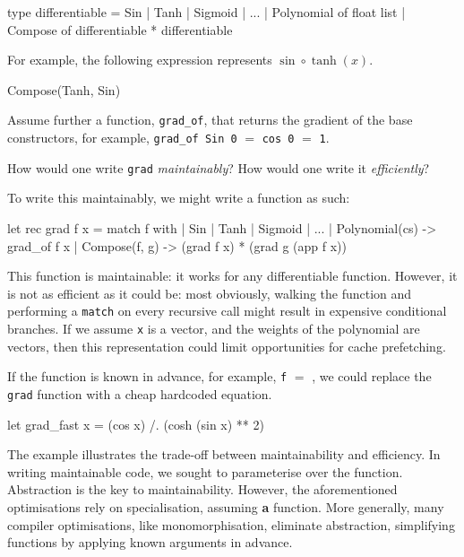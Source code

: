 \begin{ocaml}
type differentiable = Sin | Tanh | Sigmoid | ...
                    | Polynomial of float list
                    | Compose of differentiable * differentiable
\end{ocaml}
For example, the following expression represents $\sin\circ \tanh(x)$. 

\begin{ocaml}
Compose(Tanh, Sin)
\end{ocaml}

Assume further a function, \texttt{grad_of}, that returns the gradient of the base constructors, for example, \texttt{grad_of Sin 0} $=$ \texttt{cos 0} $=$ \texttt{1}.

How would one write \texttt{grad} \textit{maintainably}? How would one write it \textit{efficiently}?  

To write this maintainably, we might write a function as such: 

\begin{ocaml}
let rec grad f x = 
  match f with
  | Sin
  | Tanh
  | Sigmoid
  | ...
  | Polynomial(cs) -> grad_of f x 
  | Compose(f, g) -> (grad f x) * (grad g (app f x))

\end{ocaml}

This function is maintainable: it works for {any} differentiable function. However, it is not as efficient as it could be: most obviously, walking the function and performing a \texttt{match} on every recursive call might result in expensive conditional branches. If we assume \texttt{x} is a vector, and the weights of the polynomial are vectors, then this representation could limit opportunities for cache prefetching.

If  the function is known in advance, for example, \texttt{f} $=$ , we could replace the \texttt{grad} function with a cheap hardcoded equation. 

\begin{ocaml}
let grad_fast x = (cos x) /. (cosh (sin x) ** 2)
\end{ocaml}    

The example illustrates the trade-off between maintainability and efficiency. In writing maintainable code, we sought to parameterise over the function. Abstraction is the key to maintainability. However, the aforementioned optimisations rely on specialisation, assuming \textbf{a} function. More generally, many compiler optimisations, like monomorphisation, eliminate abstraction, simplifying functions by applying known arguments in advance. 

